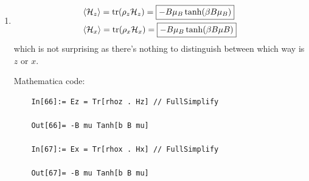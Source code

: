 \documentclass{article}
\theoremstyle{definition}
\newcommand{\ham}{\mathcal{H}}
\newcommand{\be}{\beta}
\begin{document}
\begin{enumerate}[label=(\alph*)]
	\item 
	\begin{align*}
	&\langle \ham_z \rangle = \tr(\rho_z \ham_z) = \boxed{- B \mu_B \tanh(\be B \mu_B )}\\
	&\langle \ham_x \rangle = \tr(\rho_x \ham_x) = \boxed{- B \mu_B \tanh(\be B \mu B)}
	\end{align*}
	which is not surprising as there's nothing to distinguish between which way is $z$ or $x$. 
	
	
	Mathematica code:
	\begin{lstlisting}
	In[66]:= Ez = Tr[rhoz . Hz] // FullSimplify
	
	Out[66]= -B mu Tanh[b B mu]
	
	In[67]:= Ex = Tr[rhox . Hx] // FullSimplify
	
	Out[67]= -B mu Tanh[b B mu]
	\end{lstlisting}
\end{enumerate}
\end{document}
